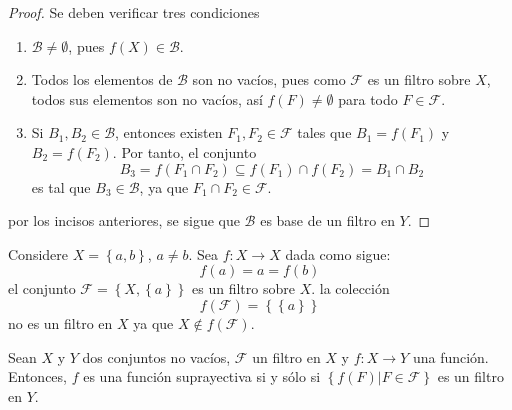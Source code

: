 \documentclass[12pt]{report}
\theoremstyle{largebreak}
\newcommand\cf[3]{\ensuremath{#1:#2\rightarrow#3}}
\begin{document}
    \begin{proof}
        Se deben verificar tres condiciones
        \begin{enumerate}
            \item $\mathcal{B}\neq\emptyset$, pues $f(X)\in\mathcal{B}$.
            \item Todos los elementos de $\mathcal{B}$ son no vacíos, pues como $\mathcal{F}$ es un filtro sobre $X$, todos sus elementos son no vacíos, así $f(F)\neq\emptyset$ para todo $F\in\mathcal{F}$.
            \item Si $B_1,B_2\in\mathcal{B}$, entonces existen $F_1,F_2\in\mathcal{F}$ tales que $B_1=f(F_1)$ y $B_2=f(F_2)$. Por tanto, el conjunto
            \begin{equation*}
                B_3=f(F_1\cap F_2)\subseteq f(F_1)\cap f(F_2)=B_1\cap B_2
            \end{equation*}
            es tal que $B_3\in\mathcal{B}$, ya que $F_1\cap F_2\in\mathcal{F}$.
        \end{enumerate}
        por los incisos anteriores, se sigue que $\mathcal{B}$ es base de un filtro en $Y$.
    \end{proof}

    \begin{exa}
        Considere $X=\left\{a,b \right\}$, $a\neq b$. Sea $\cf{f}{X}{X}$ dada como sigue:
        \begin{equation*}
            f(a)=a=f(b)
        \end{equation*}
        el conjunto $\mathcal{F}=\left\{X,\left\{a\right\} \right\}$ es un filtro sobre $X$. la colección
        \begin{equation*}
            f(\mathcal{F})=\left\{\left\{a\right\} \right\}
        \end{equation*}
        no es un filtro en $X$ ya que $X\notin f(\mathcal{F})$.
    \end{exa}

    \begin{propo}
        Sean $X$ y $Y$ dos conjuntos no vacíos, $\mathcal{F}$ un filtro en $X$ y $\cf{f}{X}{Y}$ una función. Entonces, $f$ es una función suprayectiva si y sólo si $\left\{f(F)\Big|F\in\mathcal{F} \right\}$ es un filtro en $Y$.
    \end{propo}
\end{document}
